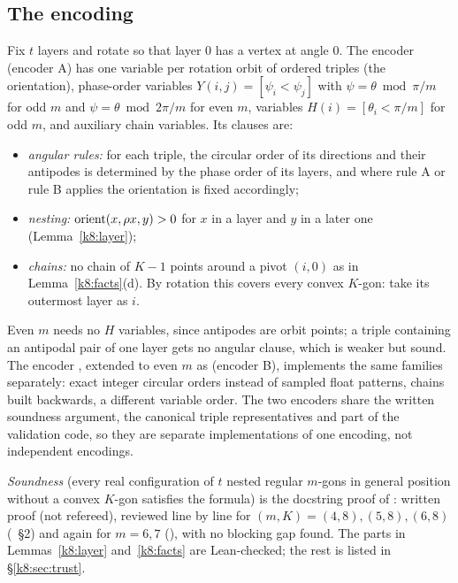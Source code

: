 \subsection{The encoding}\label{k8:sec:enc}

Fix $t$ layers and rotate so that layer $0$ has a vertex at angle $0$. The encoder  (encoder A) has
one variable per rotation orbit of ordered triples (the orientation), phase-order variables $Y(i,j)=[\psi_i<\psi_j]$
with $\psi=\theta\bmod\pi/m$ for odd $m$ and $\psi=\theta\bmod 2\pi/m$ for even $m$, variables $H(i)=[\theta_i<\pi/m]$ for
odd $m$, and auxiliary chain variables. Its clauses are:
\begin{itemize}
\item\emph{angular rules:} for each triple, the circular order of its directions and their antipodes is determined by
the phase order of its layers, and where rule A or rule B applies the orientation is fixed accordingly;
\item\emph{nesting:} $\operatorname{orient}(x,\rho x,y)>0$ for $x$ in a layer and $y$ in a later one (Lemma~\ref{k8:layer});
\item\emph{chains:} no chain of $K-1$ points around a pivot $(i,0)$ as in Lemma~\ref{k8:facts}(d). By rotation this
covers every convex $K$-gon: take its outermost layer as $i$.
\end{itemize}
Even $m$ needs no $H$ variables, since antipodes are orbit points; a triple containing an antipodal pair of one layer
gets no angular clause, which is weaker but sound. The encoder , extended to even $m$ as
 (encoder B), implements the same families separately: exact integer circular orders
instead of sampled float patterns, chains built backwards, a different variable order. The two encoders share the
written soundness argument, the canonical triple representatives and part of the validation code, so they are separate
implementations of one encoding, not independent encodings.

\emph{Soundness} (every real configuration of $t$ nested regular $m$-gons in general position without a convex $K$-gon
satisfies the formula) is the docstring proof of : written proof (not refereed), reviewed line by line for
$(m,K)=(4,8),(5,8),(6,8)$ (~\S2) and again for $m=6,7$ (), with no blocking gap found. The
parts in Lemmas~\ref{k8:layer} and~\ref{k8:facts} are Lean-checked; the rest is listed in \S\ref{k8:sec:trust}.

